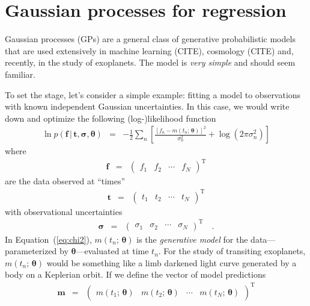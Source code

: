 \documentclass[12pt,preprint]{aastex}
\newcommand{\Eq}[1]{Equation~(\ref{eq:#1})}
\newcommand{\eq}[1]{\Eq{#1}}
\newcommand{\eqlabel}[1]{\label{eq:#1}}
\newcommand{\sectlabel}[1]{\label{sect:#1}}
\newcommand{\bvec}[1]{{\ensuremath{\boldsymbol{#1}}}}
\begin{document}
\section{Gaussian processes for regression}\sectlabel{gps}

Gaussian processes (GPs) are a general class of generative probabilistic
models that are used extensively in machine learning (CITE), cosmology (CITE)
and, recently, in the study of exoplanets.
The model is \emph{very simple} and should seem familiar.

To set the stage, let's consider a simple example: fitting a model to
observations with known independent Gaussian uncertainties.
In this case, we would write down and optimize the following (log-)likelihood
function
\begin{eqnarray}\eqlabel{chi2}
\ln p(\bvec{f}\,|\,\bvec{t},\bvec{\sigma},\bvec{\theta}) &=&
-\frac{1}{2} \sum_n \left [ \frac{[f_n - m(t_n;\,\bvec{\theta})]^2}{\sigma_n^2}
+ \log (2\pi\sigma_n^2) \right ]
\end{eqnarray}
where
\begin{eqnarray}
\bvec{f} &=& \left ( \begin{array}{cccc}
f_1 & f_2 & \cdots & f_N
\end{array} \right )^\mathrm{T}
\end{eqnarray}
are the data observed at ``times''
\begin{eqnarray}
\bvec{t} &=& \left ( \begin{array}{cccc}
t_1 & t_2 & \cdots & t_N
\end{array} \right )^\mathrm{T}
\end{eqnarray}
with observational uncertainties
\begin{eqnarray}
\bvec{\sigma} &=& \left ( \begin{array}{cccc}
\sigma_1 & \sigma_2 & \cdots & \sigma_N
\end{array} \right )^\mathrm{T} \quad.
\end{eqnarray}
In \eq{chi2}, $m(t_n;\,\bvec{\theta})$ is the \emph{generative model} for the
data---parameterized by $\bvec{\theta}$---evaluated at time $t_n$.
For the study of transiting exoplanets, $m(t_n;\,\bvec{\theta})$ would be
something like a limb darkened light curve generated by a body on a Keplerian
orbit.
If we define the vector of model predictions
\begin{eqnarray}
\bvec{m} &=& \left ( \begin{array}{cccc}
m(t_1;\,\bvec{\theta}) & m(t_2;\,\bvec{\theta}) & \cdots & m(t_N;\,\bvec{\theta})
\end{array} \right )^\mathrm{T}
\end{eqnarray}
\end{document}
